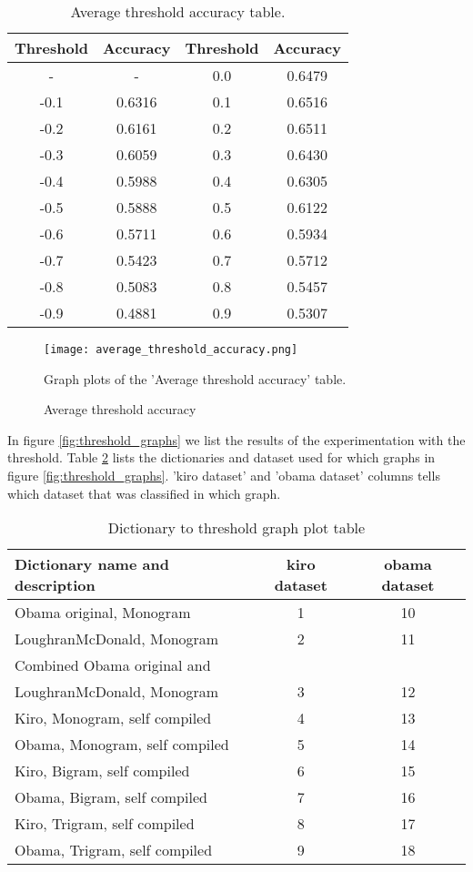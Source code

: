 \begin{table}
\centering
\label{tbl:average_threshold_accuracy}
\caption{Average threshold accuracy table.}
\begin{tabular}{ c c c c }
Threshold & Accuracy & Threshold & Accuracy \\
\hline
- & - & 0.0 & 0.6479 \\
-0.1 & 0.6316 & 0.1 & 0.6516 \\
-0.2 & 0.6161 & 0.2 & 0.6511 \\
-0.3 & 0.6059 & 0.3 & 0.6430 \\
-0.4 & 0.5988 & 0.4 & 0.6305 \\
-0.5 & 0.5888 & 0.5 & 0.6122 \\
-0.6 & 0.5711 & 0.6 & 0.5934 \\
-0.7 & 0.5423 & 0.7 & 0.5712 \\
-0.8 & 0.5083 & 0.8 & 0.5457 \\
-0.9 & 0.4881 & 0.9 & 0.5307 \\
\end{tabular}
\end{table}

\begin{figure}[htb]
    \centering
    \texttt{[image: average\_threshold\_accuracy.png]}
    \label{fig:average_threshold_accuracy}
    \caption{Average threshold accuracy}
Graph plots of the 'Average threshold accuracy' table.
\end{figure}

In figure \ref{fig:threshold_graphs} we list the results of the experimentation
with the threshold. Table \ref{tbl:dictionary_to_threshold} lists the
dictionaries and dataset used for which graphs in figure
\ref{fig:threshold_graphs}.
'kiro dataset' and 'obama dataset' columns tells which dataset that was
classified in which graph.

\begin{table}
\centering
\label{tbl:dictionary_to_threshold}
\caption{Dictionary to threshold graph plot table}
\begin{tabular}{ l c c }
Dictionary name and description & kiro dataset & obama dataset \\
\hline
Obama original, Monogram & 1 & 10 \\
LoughranMcDonald, Monogram & 2 & 11 \\
Combined Obama original and \\ LoughranMcDonald, Monogram & 3 & 12 \\
Kiro, Monogram, self compiled & 4 & 13 \\
Obama, Monogram, self compiled & 5 & 14 \\
Kiro, Bigram, self compiled & 6 & 15 \\
Obama, Bigram, self compiled & 7 & 16 \\
Kiro, Trigram, self compiled & 8 & 17 \\
Obama, Trigram, self compiled & 9 & 18 \\
\end{tabular}
\end{table}

